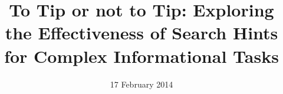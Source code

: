 \documentclass{sig-alternate}
\begin{document}
%

\title{To Tip or not to Tip: Exploring the Effectiveness of Search Hints for Complex Informational Tasks}

%
%
%
%
%


\date{17 February 2014}

\maketitle
\end{document}
